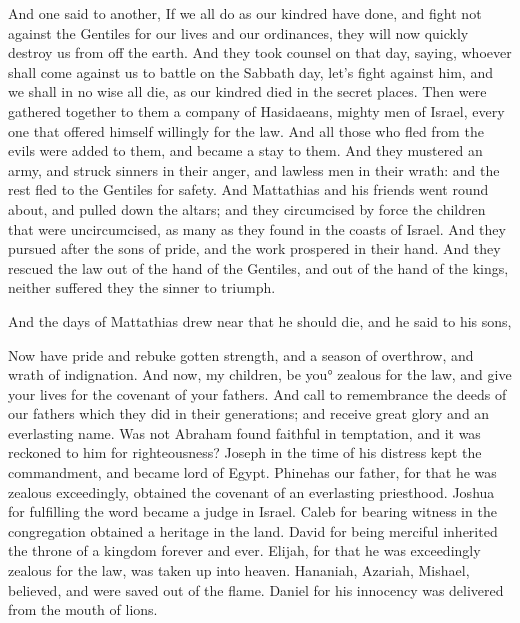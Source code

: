 {And one said to another, If we all do as our kindred have done, and fight not against the Gentiles for our lives and our ordinances, they will now quickly destroy us from off the earth.
And they took counsel on that day, saying, whoever shall come against us to battle on the Sabbath day, let’s fight against him, and we shall in no wise all die, as our kindred died in the secret places.
Then were gathered together to them a company of
 Hasidaeans, mighty men of Israel, every one that offered himself willingly for the law.
And all those who fled from the evils were added to them, and became a stay to them.
And they mustered an army, and struck sinners in their anger, and lawless men in their wrath: and the rest fled to the Gentiles for safety.
And Mattathias and his friends went round about, and pulled down the altars;
and they circumcised by force the children that were uncircumcised, as many as they found in the coasts of Israel.
And they pursued after the sons of pride, and the work prospered in their hand.
And they rescued the law out of the hand of the Gentiles, and out of the hand of the kings, neither
 suffered they the sinner to triumph.
\par }{\PP {}And the days of Mattathias drew near that he should die, and he said to his sons,
\par }{\PP Now have pride and rebuke gotten strength, and a season of overthrow, and wrath of indignation.
And now, my children, be you° zealous for the law, and give your lives for the covenant of your fathers.
And call to remembrance the deeds of our fathers which they did in their generations; and receive great glory and an everlasting name.
Was not Abraham found faithful in temptation, and it was reckoned to him for righteousness?
Joseph in the time of his distress kept the commandment, and became lord of Egypt.
Phinehas our father, for that he was zealous exceedingly, obtained the covenant of an everlasting priesthood.
Joshua for fulfilling the word became a judge in Israel.
Caleb for bearing witness in the congregation obtained a heritage in the land.
David for being merciful inherited the throne of a kingdom forever and ever.
Elijah, for that he was exceedingly zealous for the law, was taken up into heaven.
Hananiah, Azariah, Mishael, believed, and were saved out of the flame.
Daniel for his innocency was delivered from the mouth of lions.
}
